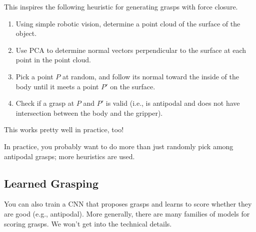 This inspires the following heuristic
for generating grasps with force closure.

\begin{enumerate}
    \item Using simple robotic vision,
    determine a point cloud of the surface of the object.
    \item Use PCA to determine normal vectors
    perpendicular to the surface at each point in the point cloud.
    \item Pick a point $P$ at random,
    and follow its normal toward the inside of the body
    until it meets a point $P'$ on the surface.
    \item Check if a grasp at $P$ and $P'$ is valid
    (i.e., is antipodal and does not have intersection between
    the body and the gripper).
\end{enumerate}

This works pretty well in practice, too!

\begin{remark}
    In practice, you probably want to do more than
    just randomly pick among antipodal grasps;
    more heuristics are used.
\end{remark}

\subsection{Learned Grasping}

You can also train a CNN that
proposes grasps and learns to score
whether they are good (e.g., antipodal).
More generally, there are many families of
models for scoring grasps.
We won't get into the technical details.

